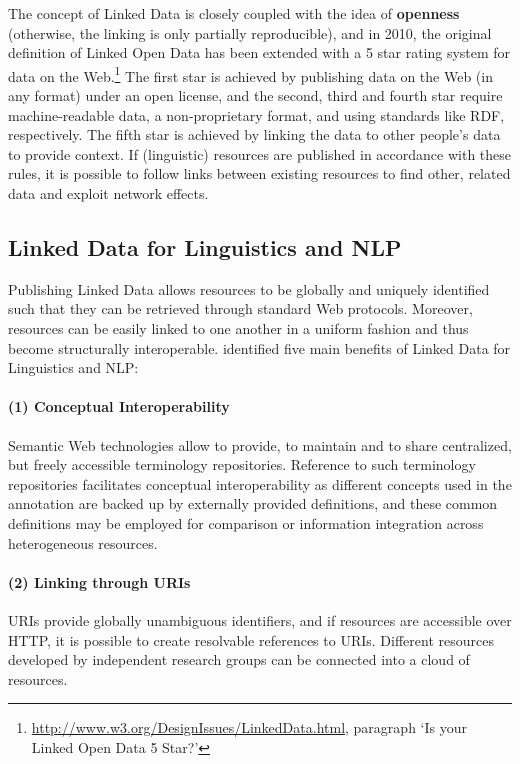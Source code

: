 The concept of Linked Data is closely coupled with the idea of \textbf{openness} (otherwise, the linking is only partially reproducible), and in 2010, the original definition of Linked Open Data has been extended with a 5 star rating system for data on the Web.\footnote{\url{http://www.w3.org/DesignIssues/LinkedData.html}, paragraph `Is your Linked Open Data 5 Star?'} The first star is achieved by publishing data on the Web (in any format) under an open license, and the second, third and fourth star require machine-readable data, a non-proprietary format, and using standards like RDF, respectively. The fifth star is achieved by linking the data to other people's data to provide context.
If (linguistic) resources are published in accordance with these rules, it is possible to follow links between existing resources to find other, related data and exploit network effects.

\subsection{Linked Data for Linguistics and NLP}
\label{sec-linked-data}

Publishing Linked Data allows resources to be globally and uniquely identified such that they can be retrieved through standard Web protocols. Moreover, resources can be easily linked to one another in a uniform fashion and thus become structurally interoperable. \citet{chiarcos-etal2012-ntrolr} identified five main benefits of Linked Data for Linguistics and NLP: 

\noindent
\paragraph{(1) Conceptual Interoperability}
Semantic Web technologies allow to provide, to maintain and to share centralized, but freely accessible terminology repositories. 
Reference to such terminology repositories facilitates conceptual interoperability as different concepts used in the annotation are backed up by externally provided definitions, and these common definitions may be employed for comparison or information integration across heterogeneous resources.

\smallskip\noindent
\paragraph{(2) Linking through URIs}
URIs provide globally unambiguous identifiers, and if resources are accessible over HTTP, it is possible to create resolvable references to URIs. Different resources developed by independent research groups can be connected into a cloud of resources.

